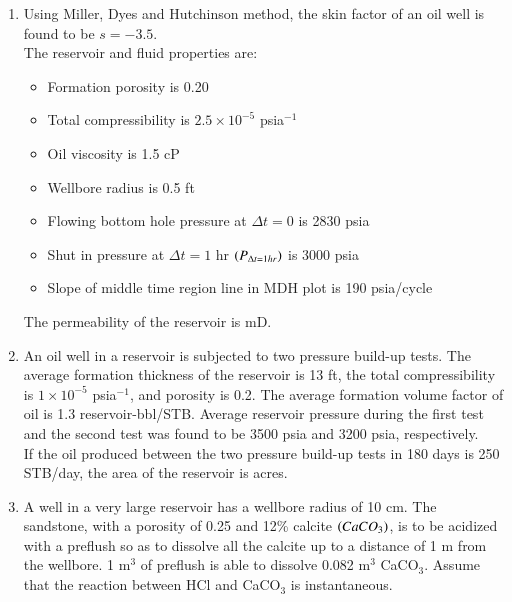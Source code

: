 \documentclass[journal,12pt,onecolumn]{IEEEtran}
\theoremstyle{remark}
\begin{document}
\begin{enumerate}
\item Using Miller, Dyes and Hutchinson  method, the skin factor of an oil well is found to be $s = -3.5$. \\ 

The reservoir and fluid properties are: 

\begin{itemize}
\item Formation porosity is 0.20
\item Total compressibility is $2.5 \times 10^{-5}$ psia$^{-1}$
\item Oil viscosity is 1.5 cP
\item Wellbore radius is 0.5 ft
\item Flowing bottom hole pressure at $\Delta t = 0$ is 2830 psia
\item Shut in pressure at $\Delta t = 1$ hr $\left(P_{\Delta t=1hr}\right)$ is 3000 psia
\item Slope of middle time region  line in MDH plot is 190 psia/cycle
\end{itemize}

The permeability of the reservoir is \underline{\hspace{2cm}} mD.  

\hfill{}

\item An oil well  in a reservoir is subjected to two pressure build-up tests. The average formation thickness of the reservoir is 13 ft, the total compressibility is $1\times10^{-5}$ psia$^{-1}$, and porosity is 0.2. The average formation volume factor of oil is 1.3 reservoir-bbl/STB. Average reservoir pressure during the first test and the second test was found to be 3500 psia and 3200 psia, respectively. \\ 
If the oil produced between the two pressure build-up tests in 180 days is 250 STB/day, the area of the reservoir is \underline{\hspace{2cm}} acres.  \\ 

\hfill{}

\item A well in a very large reservoir has a wellbore radius of 10 cm. The sandstone, with a porosity of 0.25 and 12\%  calcite $\left(CaCO_3\right)$, is to be acidized with a preflush  so as to dissolve all the calcite up to a distance of 1 m from the wellbore. 1 m$^3$ of preflush is able to dissolve 0.082 m$^3$ CaCO$_3$. Assume that the reaction between HCl and CaCO$_3$ is instantaneous. 


\end{enumerate}
\end{document}
